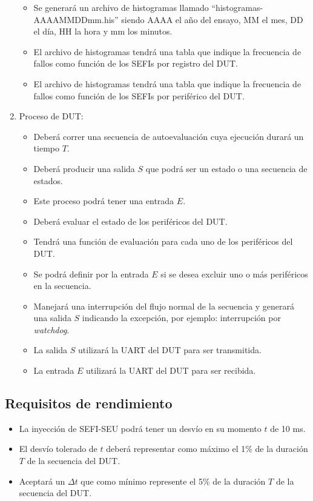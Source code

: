 \documentclass[
11pt, %
]{charter}
\begin{document}
\begin{enumerate}
\begin{itemize}
		\item Se generará un archivo de histogramas llamado ``histogramas-AAAAMMDDmm.his'' siendo AAAA el año del ensayo, MM el mes, DD el día, HH la hora y mm los minutos.
		\item El archivo de histogramas tendrá una tabla que indique la frecuencia de fallos como función de los SEFIs por registro del DUT.
		\item El archivo de histogramas tendrá una tabla que indique la frecuencia de fallos como función de los SEFIs por periférico del DUT.
	\end{itemize}
	\item Proceso de DUT:
	\begin{itemize}
		\item Deberá correr una secuencia de autoevaluación cuya ejecución durará un tiempo $ T $.
		\item Deberá producir una salida $ S $ que podrá ser un estado o una secuencia de estados.
		\item Este proceso podrá tener una entrada $ E $.
		\item Deberá evaluar el estado de los periféricos del DUT.
		\item Tendrá una función de evaluación para cada uno de los periféricos del DUT.
		\item Se podrá definir por la entrada $ E $ si se desea excluir uno o más periféricos en la secuencia.
		\item Manejará una interrupción del flujo normal de la secuencia y generará una salida $ S $ indicando la excepción, por ejemplo: interrupción por \emph{watchdog}.
		\item La salida $ S $ utilizará la UART del DUT para ser transmitida.
		\item La entrada $ E $ utilizará la UART del DUT para ser recibida.
	\end{itemize}
\end{enumerate}

\subsection{Requisitos de rendimiento}
\label{sub:rendimiento}

\begin{itemize}
	\item La inyección de SEFI-SEU podrá tener un desvío en su momento $ t $ de 10 ms.
	\item El desvío tolerado de $ t $ deberá representar como máximo el 1\% de la duración $ T $ de la secuencia del DUT.
	\item Aceptará un $ \Delta t $ que como mínimo represente el 5\% de la duración $ T $ de la secuencia del DUT.
\end{itemize}
\end{document}
